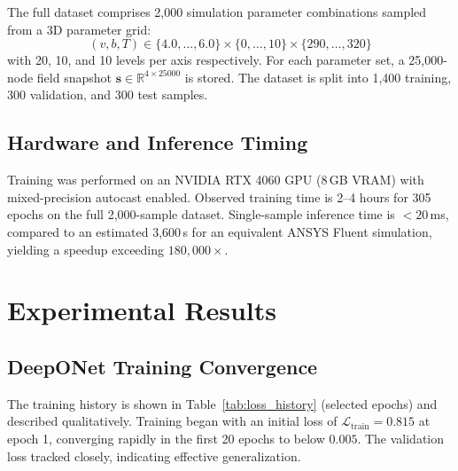 \documentclass[conference]{IEEEtran}
\begin{document}
The full dataset comprises 2,000 simulation parameter combinations sampled from a 3D parameter grid:
\[
(v, b, T) \in \{4.0,\ldots,6.0\} \times \{0,\ldots,10\} \times \{290,\ldots,320\}
\]
with 20, 10, and 10 levels per axis respectively. For each parameter set, a 25,000-node field snapshot $\mathbf{s} \in \mathbb{R}^{4 \times 25000}$ is stored. The dataset is split into 1,400 training, 300 validation, and 300 test samples.

\subsection{Hardware and Inference Timing}

Training was performed on an NVIDIA RTX 4060 GPU (8\,GB VRAM) with mixed-precision autocast enabled. Observed training time is 2–4 hours for 305 epochs on the full 2,000-sample dataset. Single-sample inference time is $<20$\,ms, compared to an estimated 3,600\,s for an equivalent ANSYS Fluent simulation, yielding a speedup exceeding $180,000\times$.

\section{Experimental Results}
\label{sec:results}

\subsection{DeepONet Training Convergence}

The training history is shown in Table~\ref{tab:loss_history} (selected epochs) and described qualitatively. Training began with an initial loss of $\mathcal{L}_\text{train} = 0.815$ at epoch 1, converging rapidly in the first 20 epochs to below $0.005$. The validation loss tracked closely, indicating effective generalization.
\end{document}
